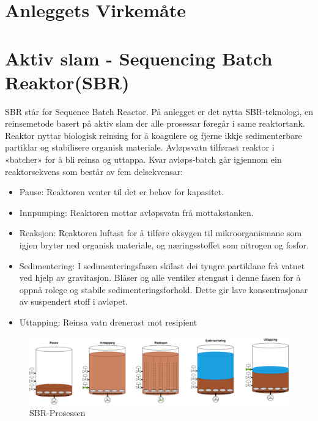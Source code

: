 \section{Anleggets Virkemåte}
\thispagestyle{fancy}

\section{Aktiv slam - Sequencing Batch Reaktor(SBR)} 
SBR står for Sequence Batch Reactor. På anlegget er det nytta SBR-teknologi, en reinsemetode basert på aktiv slam der alle prosessar føregår i same reaktortank. 
Reaktor nyttar biologisk reinsing for å koagulere og fjerne ikkje sedimenterbare partiklar og stabilisere organisk materiale. Avløpsvatn tilførast reaktor i «batcher» for å bli reinsa og uttappa. 
Kvar avløps-batch går igjennom ein reaktorsekvens som består av fem delsekvensar:

\begin{itemize}
    \item Pause: \newline Reaktoren venter til det er behov for kapasitet.
    \item Innpumping: \newline Reaktoren mottar avløpsvatn frå mottakstanken. 
    \item Reaksjon: \newline Reaktoren luftast for å tilføre oksygen til mikroorganismane som igjen bryter ned organisk materiale, 
    og næringsstoffet som nitrogen og fosfor.
    \item Sedimentering: \newline 
    I sedimenteringsfasen skilast dei tyngre partiklane frå vatnet ved hjelp av gravitasjon. 
    Blåser og alle ventiler stengast i denne fasen for å oppnå rolege og stabile sedimenteringsforhold. Dette gir lave konsentrasjonar av suspendert stoff i avløpet.
    \item Uttapping: \newline Reinsa vatn drenerast mot resipient
\end{itemize}

\begin{figure}[htbp]
    \centering
    \includegraphics[width=1\textwidth]{Figurar/SBR-Prosessen.png}
    \caption{SBR-Prosessen}\label{fig:SBR-prossessen}
\end{figure}
    